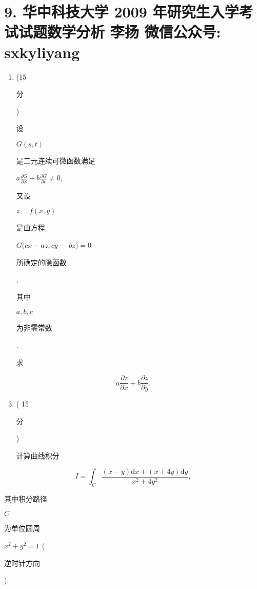 \documentclass[10pt]{article}
\begin{document}
\section{9. 华中科技大学 2009 年研究生入学考试试题数学分析 
 李扬 
 微信公众号: sxkyliyang}
\begin{enumerate}
  \item (15 \begin{CJK}{UTF8}{mj}分\end{CJK}) \begin{CJK}{UTF8}{mj}设\end{CJK} $G(s, t)$ \begin{CJK}{UTF8}{mj}是二元连续可微函数满足\end{CJK} $a \frac{\partial G}{\partial S}+b \frac{\partial G}{\partial t} \neq 0$, \begin{CJK}{UTF8}{mj}又设\end{CJK} $z=f(x, y)$ \begin{CJK}{UTF8}{mj}是由方程\end{CJK} $G(c x-a z, c y-$ $b z)=0$ \begin{CJK}{UTF8}{mj}所确定的隐函数\end{CJK}, \begin{CJK}{UTF8}{mj}其中\end{CJK} $a, b, c$ \begin{CJK}{UTF8}{mj}为非零常数\end{CJK}. \begin{CJK}{UTF8}{mj}求\end{CJK}
\end{enumerate}
$$
a \frac{\partial z}{\partial x}+b \frac{\partial z}{\partial y} .
$$

\begin{enumerate}
  \setcounter{enumi}{2}
  \item ( 15 \begin{CJK}{UTF8}{mj}分\end{CJK}) \begin{CJK}{UTF8}{mj}计算曲线积分\end{CJK}
\end{enumerate}
$$
I=\int_{C} \frac{(x-y) \mathrm{d} x+(x+4 y) \mathrm{d} y}{x^{2}+4 y^{2}},
$$
\begin{CJK}{UTF8}{mj}其中积分路径\end{CJK} $C$ \begin{CJK}{UTF8}{mj}为单位圆周\end{CJK} $x^{2}+y^{2}=1$ (\begin{CJK}{UTF8}{mj}逆时针方向\end{CJK}).
\end{document}
